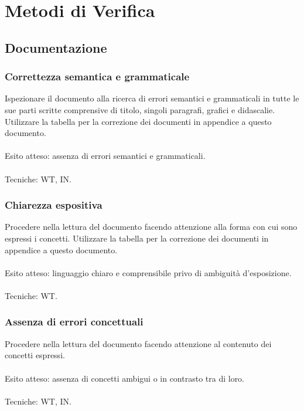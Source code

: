 \section{Metodi di Verifica}

\subsection{Documentazione}

\subsubsection{Correttezza semantica e grammaticale}

Ispezionare il documento alla ricerca di errori semantici e grammaticali in
tutte le sue parti scritte comprensive di titolo, singoli paragrafi, grafici e didascalie.
Utilizzare la tabella per la correzione dei documenti in appendice a questo
documento.
\\\\
Esito atteso: assenza di errori semantici e grammaticali.
\\\\
Tecniche: WT, IN.

\subsubsection{Chiarezza espositiva}

Procedere nella lettura del documento facendo attenzione alla forma con cui
sono espressi i concetti. Utilizzare la tabella per la correzione dei documenti
in appendice a questo documento.
\\\\
Esito atteso: linguaggio chiaro e comprensibile privo di ambiguit\`a
d'esposizione.
\\\\
Tecniche: WT.

\subsubsection{Assenza di errori concettuali}

Procedere nella lettura del documento facendo attenzione al contenuto dei
concetti espressi.\\\\
Esito atteso: assenza di concetti ambigui o in contrasto tra di loro.
\\\\
Tecniche: WT, IN.

